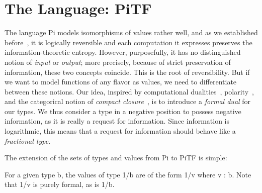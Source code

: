 \documentclass[preprint]{sigplanconf}
\begin{document}

\section{The Language: {{PiTF}} }

The language {{Pi}} models isomorphisms of values rather well, and as we
established before~\cite{James:2012:IE:2103656.2103667,rc2011,rc2012}, it is
logically reversible and each computation it expresses preserves the
information-theoretic entropy. However, purposefully, it has no distinguished
notion of \emph{input} or \emph{output}; more precisely, because of strict
preservation of information, these two concepts coincide.  This is the root
of reversibility. But if we want to model functions of any flavor as values,
we need to differentiate between these notions. Our idea, inspired by
computational dualities~\cite{Filinski:1989:DCI:648332.755574,Curien:2000},
polarity~\cite{Girard87tcs,10.1109/LICS.2010.23}, and the categorical notion
of \emph{compact
  closure}~\cite{Selinger:2007:DCC:1229185.1229207,Abramsky:2004:CSQ:1018438.1021878},
is to introduce a \emph{formal dual} for our types.  We thus consider a type
in a negative position to possess negative information, as it is really a
request for information.  Since information is logarithmic, this means that a
request for information should behave like a \emph{fractional type}.





The extension of the sets of types and values from {{Pi}} to {{PiTF}} is
simple:

\noindent For a given type {{b}}, the values of type {{1/b}} are of the form
{{1/v}} where {{v : b}}. Note that {{1/v}} is purely formal, as is
{{1/b}}. 
\end{document}
